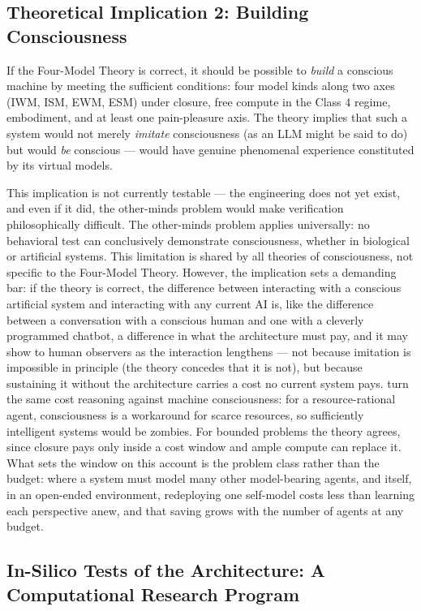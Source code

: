 \documentclass[12pt]{article}
\begin{document}
\subsection{Theoretical Implication 2: Building Consciousness}


If the Four-Model Theory is correct, it should be possible to \emph{build} a conscious machine by meeting the sufficient conditions: four model kinds along two axes (IWM, ISM, EWM, ESM) under closure, free compute in the Class 4 regime, embodiment, and at least one pain-pleasure axis. The theory implies that such a system would not merely \emph{imitate} consciousness (as an LLM might be said to do) but would \emph{be} conscious --- would have genuine phenomenal experience constituted by its virtual models.

This implication is not currently testable --- the engineering does not yet exist, and even if it did, the other-minds problem would make verification philosophically difficult. The other-minds problem applies universally: no behavioral test can conclusively demonstrate consciousness, whether in biological or artificial systems. This limitation is shared by all theories of consciousness, not specific to the Four-Model Theory. However, the implication sets a demanding bar: if the theory is correct, the difference between interacting with a conscious artificial system and interacting with any current AI is, like the difference between a conversation with a conscious human and one with a cleverly programmed chatbot, a difference in what the architecture must pay, and it may show to human observers as the interaction lengthens --- not because imitation is impossible in principle (the theory concedes that it is not), but because sustaining it without the architecture carries a cost no current system pays. \citet{TiehenTubert2026} turn the same cost reasoning against machine consciousness: for a resource-rational agent, consciousness is a workaround for scarce resources, so sufficiently intelligent systems would be zombies. For bounded problems the theory agrees, since closure pays only inside a cost window and ample compute can replace it. What sets the window on this account is the problem class rather than the budget: where a system must model many other model-bearing agents, and itself, in an open-ended environment, redeploying one self-model costs less than learning each perspective anew, and that saving grows with the number of agents at any budget.


\subsection{In-Silico Tests of the Architecture: A Computational Research Program}
\end{document}
